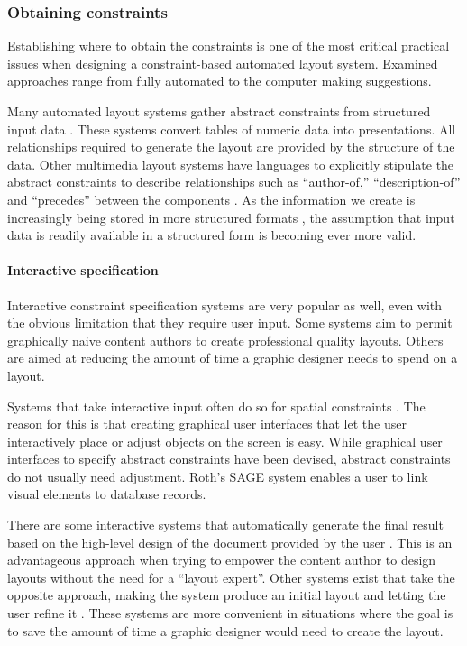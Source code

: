     \subsubsection{Obtaining constraints}

     Establishing where to obtain the constraints is one of the most critical
     practical issues when designing a constraint-based automated layout
     system. Examined approaches range from fully automated to the computer
     making suggestions.

     Many automated layout systems gather abstract constraints from structured
     input data \citep{mackinlay-1,casner-1,borning-1,beach-1}. These systems
     convert tables of numeric data into presentations. All relationships
     required to generate the layout are provided by the structure of the data.
     Other multimedia layout systems have languages to explicitly stipulate the
     abstract constraints to describe relationships such as “author-of,”
     “description-of” and “precedes” between the components
     \citep{weitzman-2,graf-1}. As the information we create is increasingly
     being stored in more structured formats \citep{bray-1}, the assumption
     that input data is readily available in a structured form is becoming ever
     more valid.

     \paragraph{Interactive specification}

      Interactive constraint specification systems are very popular as well,
      even with the obvious limitation that they require user input. Some
      systems aim to permit graphically naive content authors to create
      professional quality layouts. Others are aimed at reducing the amount of
      time a graphic designer needs to spend on a layout.

      Systems that take interactive input often do so for spatial constraints
      \citep{singh-2,hudson-2,borning-1}. The reason for this is that creating
      graphical user interfaces that let the user interactively place or adjust
      objects on the screen is easy. While graphical user interfaces to specify
      abstract constraints have been devised, abstract constraints do not
      usually need adjustment. Roth’s SAGE system \citep{roth-1} enables a user
      to link visual elements to database records.

      There are some interactive systems that automatically generate the final
      result based on the high-level design of the document provided by the
      user \citep{kim-1}. This is an advantageous approach when trying to
      empower the content author to design layouts without the need for a
      ``layout expert''. Other systems exist that take the opposite approach,
      making the system produce an initial layout and letting the user refine
      it \citep{singh-1}. These systems are more convenient in situations where
      the goal is to save the amount of time a graphic designer would need to
      create the layout.

